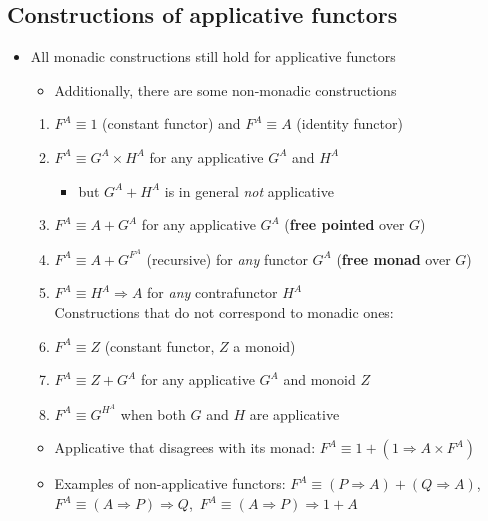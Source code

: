 \subsection{Constructions of applicative functors}
\begin{itemize}
\item \vspace{-0.10cm}All monadic constructions still hold for applicative
functors
\begin{itemize}
\item Additionally, there are some non-monadic constructions
\end{itemize}
\begin{enumerate}
\item $F^{A}\equiv1$ (constant functor) and $F^{A}\equiv A$ (identity
functor)
\item $F^{A}\equiv G^{A}\times H^{A}$ for any applicative $G^{A}$ and
$H^{A}$
\begin{itemize}
\item but $G^{A}+H^{A}$ is in general \emph{not} applicative
\end{itemize}
\item $F^{A}\equiv A+G^{A}$ for any applicative $G^{A}$ (\textbf{free
pointed} over $G$)
\item $F^{A}\equiv A+G^{F^{A}}$ (recursive) for \emph{any} functor $G^{A}$
(\textbf{free monad} over $G$)
\item $F^{A}\equiv H^{A}\Rightarrow A$ for \emph{any} contrafunctor $H^{A}$\\
Constructions that do not correspond to monadic ones:
\item $F^{A}\equiv Z$ (constant functor, $Z$ a monoid)
\item $F^{A}\equiv Z+G^{A}$ for any applicative $G^{A}$ and monoid $Z$
\item $F^{A}\equiv G^{H^{A}}$ when both $G$ and $H$ are applicative
\end{enumerate}
\begin{itemize}
\item Applicative that disagrees with its monad: $F^{A}\equiv1+\left(1\Rightarrow A\times F^{A}\right)$ 
\item Examples of non-applicative functors: $F^{A}\equiv\left(P\Rightarrow A\right)+\left(Q\Rightarrow A\right)$,
$F^{A}\equiv\left(A\Rightarrow P\right)\Rightarrow Q$,\  $F^{A}\equiv\left(A\Rightarrow P\right)\Rightarrow1+A$
\end{itemize}
\end{itemize}



